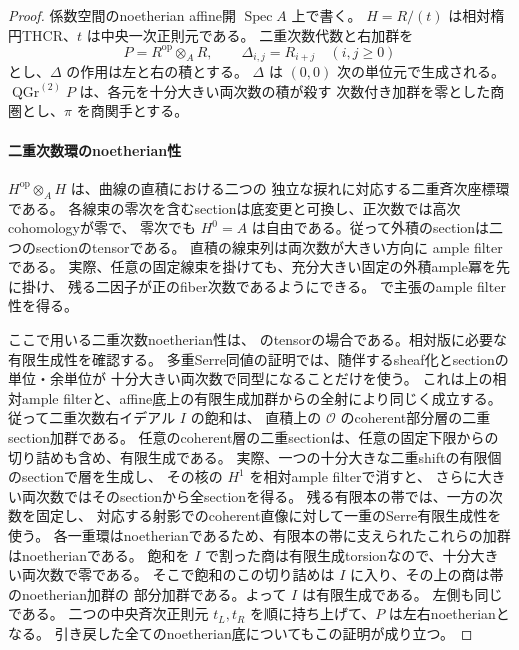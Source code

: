 \begin{proof}
係数空間のnoetherian affine開 $\operatorname{Spec}A$ 上で書く。
$H=R/(t)$ は相対楕円THCR、$t$ は中央一次正則元である。
二重次数代数と右加群を
\[
 P=R^{\mathrm{op}}\otimes_A R,\qquad
 \Delta_{i,j}=R_{i+j}\quad(i,j\ge0)
\]
とし、$\Delta$ の作用は左と右の積とする。
$\Delta$ は $(0,0)$ 次の単位元で生成される。
$\operatorname{QGr}^{(2)}P$ は、各元を十分大きい両次数の積が殺す
次数付き加群を零とした商圏とし、$\pi$ を商関手とする。

\paragraph{二重次数環のnoetherian性}
$H^{\mathrm{op}}\otimes_A H$ は、曲線の直積における二つの
独立な捩れに対応する二重斉次座標環である。
各線束の零次を含むsectionは底変更と可換し、正次数では高次cohomologyが零で、
零次でも $H^0= A$ は自由である。従って外積のsectionは二つのsectionのtensorである。
直積の線束列は両次数が大きい方向に ample filter である。
実際、任意の固定線束を掛けても、充分大きい固定の外積ample冪を先に掛け、
残る二因子が正のfiber次数であるようにできる。
\cite[定理1.3]{KeelerAmpleFilters}で主張のample filter性を得る。

ここで用いる二重次数noetherian性は、\cite[定理3.4, 系5.8]{ChanTwistedMulti}
のtensorの場合である。相対版に必要な有限生成性を確認する。
多重Serre同値の証明では、随伴するsheaf化とsectionの単位・余単位が
十分大きい両次数で同型になることだけを使う。
これは上の相対ample filterと、affine底上の有限生成加群からの全射により同じく成立する。
従って二重次数右イデアル $I$ の飽和は、
直積上の $\mathcal O$ のcoherent部分層の二重section加群である。
任意のcoherent層の二重sectionは、任意の固定下限からの切り詰めも含め、有限生成である。
実際、一つの十分大きな二重shiftの有限個のsectionで層を生成し、
その核の $H^1$ を相対ample filterで消すと、
さらに大きい両次数ではそのsectionから全sectionを得る。
残る有限本の帯では、一方の次数を固定し、
対応する射影でのcoherent直像に対して一重のSerre有限生成性を使う。
各一重環はnoetherianであるため、有限本の帯に支えられたこれらの加群はnoetherianである。
飽和を $I$ で割った商は有限生成torsionなので、十分大きい両次数で零である。
そこで飽和のこの切り詰めは $I$ に入り、その上の商は帯のnoetherian加群の
部分加群である。よって $I$ は有限生成である。
左側も同じである。
二つの中央斉次正則元 $t_L,t_R$ を順に持ち上げて、$P$ は左右noetherianとなる。
引き戻した全てのnoetherian底についてもこの証明が成り立つ。


\end{proof}
